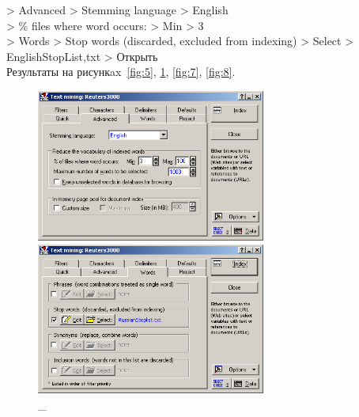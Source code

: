 > Advanced > Stemming language > English \\
> \% files where word occurs: > Min > 3 \\
> Words > Stop words (discarded, excluded from indexing) > Select > EnglishStopList,txt > Открыть \\

Результаты на рисункax~\ref{fig:5}, \ref{fig:6}, \ref{fig:7}, \ref{fig:8}.

\begin{figure}[!h]
  \centering

  \begin{minipage}{0.49\textwidth}
    \centering

    \includegraphics[height=5cm]
    {inc/5.PNG}

    \caption{\_}

    \label{fig:5}
  \end{minipage}
  \begin{minipage}{0.49\textwidth}
    \centering

    \includegraphics[height=5cm]
    {inc/6.PNG}

    \caption{\_}

    \label{fig:6}
  \end{minipage}
\end{figure}


